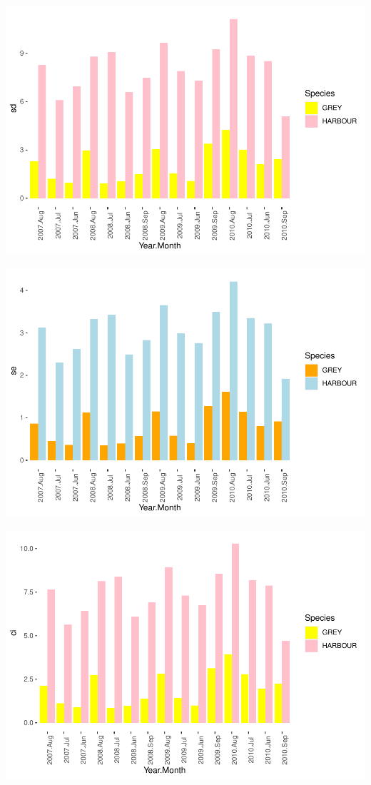 \documentclass[
]{article}
\begin{document}
\includegraphics{Statistical-analysis-in-RStudio_files/figure-latex/unnamed-chunk-33-1.pdf}

\includegraphics{Statistical-analysis-in-RStudio_files/figure-latex/unnamed-chunk-34-1.pdf}

\includegraphics{Statistical-analysis-in-RStudio_files/figure-latex/unnamed-chunk-35-1.pdf}
\end{document}
